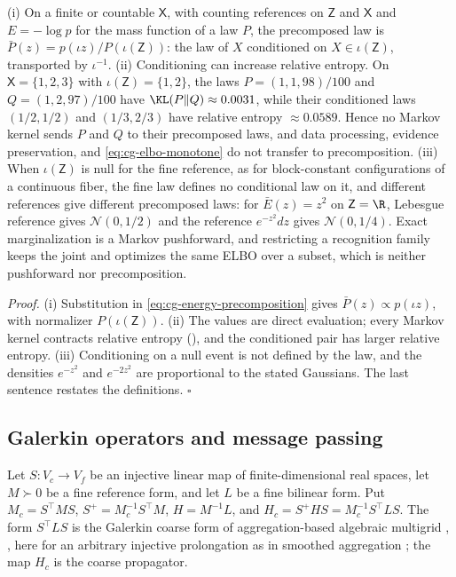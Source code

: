(i) On a finite or countable $\mathsf X$, with counting references on $\mathsf Z$ and $\mathsf X$
and $E=-\log p$ for the mass function of a law $P$, the precomposed law is
$\bar P(z)=p(\iota z)/P(\iota(\mathsf Z))$: the law of $X$ conditioned on $X\in\iota(\mathsf Z)$,
transported by $\iota^{-1}$. (ii) Conditioning can increase relative entropy. On
$\mathsf X=\{1,2,3\}$ with $\iota(\mathsf Z)=\{1,2\}$, the laws $P=(1,1,98)/100$ and
$Q=(1,2,97)/100$ have $\KL(P\Vert Q)\approx0.0031$, while their conditioned laws $(1/2,1/2)$ and
$(1/3,2/3)$ have relative entropy $\approx0.0589$. Hence no Markov kernel sends $P$ and $Q$ to their
precomposed laws, and data processing, evidence preservation, and \eqref{eq:cg-elbo-monotone} do not
transfer to precomposition. (iii) When $\iota(\mathsf Z)$ is null for the fine reference, as for
block-constant configurations of a continuous fiber, the fine law defines no conditional law on it,
and different references give different precomposed laws: for $\bar E(z)=z^2$ on $\mathsf Z=\R$,
Lebesgue reference gives $\mathcal N(0,1/2)$ and the reference $e^{-z^2}dz$ gives
$\mathcal N(0,1/4)$. Exact marginalization is a Markov pushforward, and restricting a recognition
family keeps the joint and optimizes the same ELBO over a subset, which is neither pushforward nor
precomposition. 

\noindent\emph{Proof.}
(i) Substitution in \eqref{eq:cg-energy-precomposition} gives $\bar P(z)\propto p(\iota z)$, with
normalizer $P(\iota(\mathsf Z))$. (ii) The values are direct evaluation; every Markov kernel
contracts relative entropy (), and the conditioned pair has larger
relative entropy. (iii) Conditioning on a null event is not defined by the law, and the densities
$e^{-z^2}$ and $e^{-2z^2}$ are proportional to the stated Gaussians. The last sentence restates the
definitions. $\square$

\subsection{Galerkin operators and message passing}
\label{sec:cg-galerkin}

\label{eq:cg-galerkin-data}
Let $S:V_c\to V_f$ be an injective linear map of finite-dimensional real spaces, let $M\succ0$ be a
fine reference form, and let $L$ be a fine bilinear form. Put $M_c=S^\top MS$,
$S^+=M_c^{-1}S^\top M$, $H=M^{-1}L$, and $H_c=S^+HS=M_c^{-1}S^\top LS$. The form $S^\top LS$
is the Galerkin coarse form of aggregation-based algebraic multigrid
\citep[Eqs.~(2.1) and (2.2)]{Notay2010Aggregation}, \citep[Sec.~2]{LivneBrandt2012LAMG}, here for
an arbitrary injective prolongation as in smoothed aggregation \citep{VanekMandelBrezina1996}; the
map $H_c$ is the coarse propagator.

